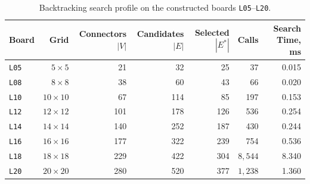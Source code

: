 \documentclass[10pt, a4paper]{article}
\newcommand{\code}[1]{\texttt{\color{primary!90!black}#1}}
\begin{document}
\vspace{-0.2em}
\begin{table}[H]
\centering
\caption{Backtracking search profile on the constructed boards \code{L05}--\code{L20}.}
\label{tab:large}
\renewcommand{\arraystretch}{0.92}
\setlength{\tabcolsep}{4.4pt}
\begin{tabular}{@{}lrrrrrr@{}}
\toprule
\textbf{\color{primary}Board} & \textbf{\color{primary}Grid} & \textbf{\color{primary}Connectors $|V|$} & \textbf{\color{primary}Candidates $|E|$} & \textbf{\color{primary}Selected $|E^*|$} & \textbf{\color{primary}Calls} & \textbf{\color{primary}Search Time, ms} \\
\midrule
\code{L05} & $5 \times 5$   &  21 &  32 &  25 &      37 & 0.015 \\
\code{L08} & $8 \times 8$   &  38 &  60 &  43 &      66 & 0.020 \\
\code{L10} & $10 \times 10$ &  67 & 114 &  85 &     197 & 0.153 \\
\code{L12} & $12 \times 12$ & 101 & 178 & 126 &     536 & 0.254 \\
\code{L14} & $14 \times 14$ & 140 & 252 & 187 &     430 & 0.244 \\
\code{L16} & $16 \times 16$ & 177 & 322 & 239 &     754 & 0.536 \\
\code{L18} & $18 \times 18$ & 229 & 422 & 304 & $8{,}544$ & 8.340 \\
\code{L20} & $20 \times 20$ & 280 & 520 & 377 & $1{,}238$ & 1.360 \\
\bottomrule
\end{tabular}
\end{table}
\vspace{-0.3em}
\end{document}
